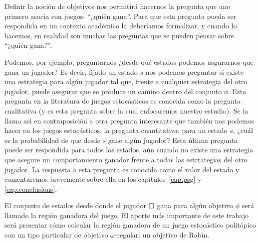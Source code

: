 
Definir la noción de objetivos nos permitirá hacernos la pregunta que uno
primero asocia con juegos: ``¿quién gana''. Para que esta pregunta pueda ser
respondida en un contexto académico la deberíamos formalizar, y cuando lo
hacemos, en realidad son muchas las preguntas que se pueden pensar sobre
``¿quién gana?''.

Podemos, por ejemplo, preguntarnos ¿desde qué estados podemos asgurarnos que
gana un jugador? Es decir, fijado un estado $s$ nos podemos preguntar si existe
una estrategia para algún jugador tal que, frente a cualquier estrategia del
otro jugador, puede asegurar que se produce un camino dentro del conjunto
$\phi$. Esta pregunta en la literatura de juegos estocásticos es conocida como
la pregunta cualitativa (y es esta pregunta sobre la cual enfocaremos nuestro
estudio). Se la llama así en contraposición a otra pregunta interesante que
también nos podemos hacer en los juegos estocásticos, la pregunta cuantitativa:
para un estado $s$, ¿cuál es la probabilidad de que desde $s$ gane algún
jugador? Esta última pregunta puede ser respondida para todos los estados, aún
cuando no existe una estrategia que asegure un comportamiento ganador frente a
todas las estrtategias del otro jugador. La respuesta a esta pregunta es
conocida como el valor del estado y comentaremos brevemente sobre ella en los
capítulos~\ref{cap:psg} y \ref{cap:conclusions}.

El conjunto de estados desde donde el jugador $\square$ gana para algún objetivo
$\phi$ será llamado la región ganadora del juego. El aporte más importante de
este trabajo será presentar cómo calcular la región ganadora de un juego
estocástico politópico con un tipo particular de objetivo $\omega$-regular: un
objetivo de Rabin.


